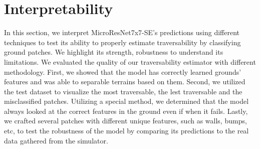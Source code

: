 \documentclass[../document.tex]{subfiles}
\begin{document}
\chapter{Interpretability}
\label{chap: interpretability}
In this section, we interpret MicroResNet7x7-SE's predictions using different techniques to test its ability to properly estimate traversability by classifying ground patches. We highlight its strength, robustness to understand its limitations. We evaluated the quality of our traversability estimator with different methodology. First, we showed that the model has correctly learned grounds' features and was able to separable terrains based on them. Second, we utilized the test dataset to visualize the most traversable, the lest traversable and the misclassified patches.  Utilizing a special method, we determined that the model always looked at the correct features in the ground even if when it fails. Lastly, we crafted several patches with different unique features, such as walls, bumps, etc, to test the robustness of the model by comparing its predictions to the real data gathered from the simulator. 
\end{document}
